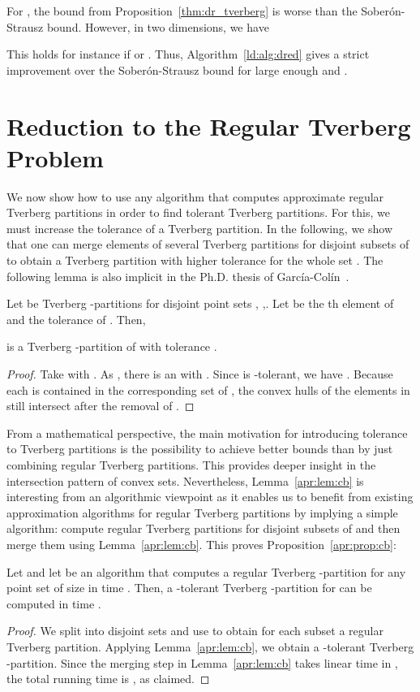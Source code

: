 \documentclass[oribibl,envcountsame,envcountsect]{llncs}
\newcommand{\Soberon}{Sober\'{o}n}
\newcommand{\GarciaColin}{Garc\'{i}a-Col\'{i}n}
\begin{document}
For , the bound from Proposition~\ref{thm:dr_tverberg}
is worse than the \Soberon{}-Strausz bound. However, in two dimensions, we have


This holds for instance if  or .
Thus, Algorithm~\ref{ld:alg:dred} gives a strict improvement over
the \Soberon{}-Strausz bound for large enough  and .

\section{Reduction to the Regular Tverberg Problem}\label{sec:redregtver}

We now show how to use any algorithm that computes approximate
regular Tverberg partitions in order to find tolerant Tverberg partitions.
For this, we must increase the tolerance of a Tverberg partition.
In the following, we show that one can merge elements of several
Tverberg partitions for disjoint subsets of 
to obtain a Tverberg partition with higher tolerance for the whole set .
The following lemma is also implicit in the Ph.D. thesis of
\GarciaColin{}~\cite{GarciaColin2007}.

\begin{lemma}
  \label{apr:lem:cb}
  Let  be Tverberg -partitions
  for disjoint point sets , ,.
  Let  be the th element of  and 
  the tolerance of .
  Then,
    
  is a Tverberg -partition of  with tolerance
  .
\end{lemma}
\begin{proof}
  Take  with . As
  , there is an  with
  .
  Since  is -tolerant, we have
  . Because each
   is contained in the corresponding set  of ,
  the convex hulls of the elements in  still intersect after the removal
  of .
\end{proof}

From a mathematical perspective, the main motivation for
introducing tolerance to Tverberg partitions is the possibility
to achieve better bounds than by just combining regular Tverberg
partitions. This provides deeper insight in the intersection pattern
of convex sets. Nevertheless, Lemma~\ref{apr:lem:cb} is interesting
from an algorithmic viewpoint as it enables us to benefit from
existing approximation algorithms for regular Tverberg partitions
by implying a simple algorithm: compute regular Tverberg
partitions for disjoint subsets of  and then merge them using
Lemma~\ref{apr:lem:cb}. This proves Proposition~\ref{apr:prop:cb}:

\begin{proposition}
  Let  and let  be an
  algorithm that computes a regular Tverberg -partition
  for any point set of size  in time .
  Then, a -tolerant Tverberg
  -partition for  can be computed in time
  .
\end{proposition}
\begin{proof}
  We split  into  disjoint sets and use
   to obtain for each subset a regular Tverberg partition. Applying
  Lemma~\ref{apr:lem:cb}, we obtain a -tolerant Tverberg -partition. Since the merging step in
  Lemma~\ref{apr:lem:cb} takes linear time in , the total running time is
  , as
  claimed.
\end{proof}
\end{document}
